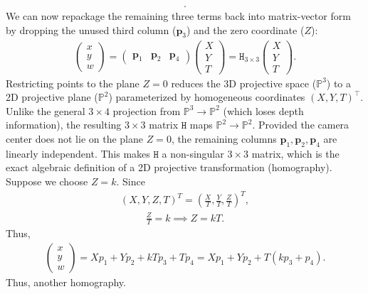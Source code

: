 \documentclass{report}
\begin{document}
\begin{itemize}
\begin{align*}
            .\end{align*}
            We can now repackage the remaining three terms back into matrix-vector form by dropping the unused third column (\(\mathbf{p}_{3}\)) and the zero coordinate (\(Z\)):
            \begin{align*}
                \left(\begin{matrix}x\\ y\\ w\end{matrix}\right)=\left(\begin{matrix}\mathbf{p}_{1}&\mathbf{p}_{2}&\mathbf{p}_{4}\end{matrix}\right)\left(\begin{matrix}X\\ Y\\ T\end{matrix}\right)=\mathtt{H}_{3\times 3}\left(\begin{matrix}X\\ Y\\ T\end{matrix}\right)
            .\end{align*}
            Restricting points to the plane \(Z = 0\) reduces the 3D projective space (\(\mathbb{P}^{3}\)) to a 2D projective plane (\(\mathbb{P}^{2}\)) parameterized by homogeneous coordinates \((X, Y, T)^\top\).
            \bigbreak \noindent 
            Unlike the general \(3 \times 4\) projection from \(\mathbb{P}^3 \to \mathbb{P}^2\) (which loses depth information), the resulting \(3 \times 3\) matrix \(\mathtt{H}\) maps \(\mathbb{P}^2 \to \mathbb{P}^2\).
            \bigbreak \noindent 
            Provided the camera center does not lie on the plane \(Z = 0\), the remaining columns \(\mathbf{p}_1, \mathbf{p}_2, \mathbf{p}_4\) are linearly independent. This makes \(\mathtt{H}\) a non-singular \(3 \times 3\) matrix, which is the exact algebraic definition of a 2D projective transformation (homography).
            \bigbreak \noindent 
            Suppose we choose $Z = k$. Since
            \begin{align*}
                (X,Y,Z,T)^{T} = \left(\frac{X}{T}, \frac{Y}{T}, \frac{Z}{T}\right)^{T}
            ,\end{align*}
            \begin{align*}
                \frac{Z}{T} = k \implies Z = kT
            .\end{align*}
            Thus,
            \begin{align*}
                \begin{pmatrix} x \\y \\w \end{pmatrix} = Xp_{1} + Yp_{2} + kTp_{3} + Tp_{4} = Xp_{1} + Yp_{2} + T(kp_{3} + p_{4})
            .\end{align*}
            Thus, another homography.


\end{itemize}
\end{document}
